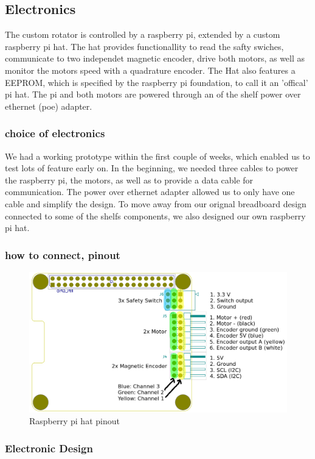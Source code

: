 \subsection{Electronics}
The custom rotator is controlled by a raspberry pi, extended by a custom raspberry pi hat. The hat provides functionallity to read the safty swiches, communicate to two independet magnetic encoder, drive both motors, as well as monitor the motors speed with a quadrature encoder. The Hat also features a EEPROM, which is specified by the raspberry pi foundation, to call it an 'offical' pi hat. The pi and both motors are powered through an of the shelf power over ethernet (poe) adapter.

\subsubsection{choice of electronics}
We had a working prototype within the first couple of weeks, which enabled us to test lots of feature early on. In the beginning, we needed three cables to power the raspberry pi, the motors, as well as to provide a data cable for communication. The power over ethernet adapter allowed us to only have one cable and simplify the design.
To move away from our orignal breadboard design connected to some of the shelfs components, we also designed our own raspberry pi hat.


\subsubsection{how to connect, pinout}
\begin{figure}[h]
	\centering
	\includegraphics[width=\linewidth]{../art/PCB Pinout.png}
	\caption{Raspberry pi hat pinout}
\end{figure}

\subsubsection{Electronic Design}


